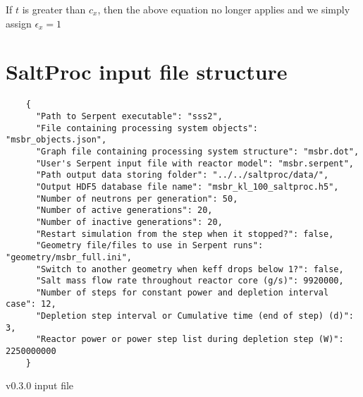 If $t$ is greater than $c_{x}$, then the above equation no longer applies and we simply assign $\epsilon_{x} = 1$

\chapter{SaltProc input file structure}
\label{appex:input-files}

\begin{listing}[!ht]
    \begin{verbatim}
    {
      "Path to Serpent executable": "sss2",
      "File containing processing system objects": "msbr_objects.json",
      "Graph file containing processing system structure": "msbr.dot",
      "User's Serpent input file with reactor model": "msbr.serpent",
      "Path output data storing folder": "../../saltproc/data/",
      "Output HDF5 database file name": "msbr_kl_100_saltproc.h5",
      "Number of neutrons per generation": 50,
      "Number of active generations": 20,
      "Number of inactive generations": 20,
      "Restart simulation from the step when it stopped?": false,
      "Geometry file/files to use in Serpent runs": "geometry/msbr_full.ini",
      "Switch to another geometry when keff drops below 1?": false,
      "Salt mass flow rate throughout reactor core (g/s)": 9920000,
      "Number of steps for constant power and depletion interval case": 12,
      "Depletion step interval or Cumulative time (end of step) (d)": 3,
      "Reactor power or power step list during depletion step (W)": 2250000000
    }
    \end{verbatim}
    \caption{\SaltProc v0.3.0 input file}
    \label{listing:1}
\end{listing}

